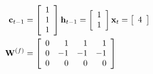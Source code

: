 \documentclass[xcolor={table}]{beamer}
\begin{document}
 \begin{frame} 
\begin{alignat}{2}
 \mathbf{c}_{t-1} &= 
 \left[
  \begin{array}{c}
1 \\
1 \\
1\\
  \end{array} 
  \right] 
 \mathbf{h}_{t-1} = 
 \left[
 \begin{array}{c}
   1 \\
   1 \\
  \end{array} 
  \right] 
 \mathbf{x}_{t}  = 
 \left[
 \begin{array}{c}
   4 \\
  \end{array} 
  \right] \notag\\
  \mathbf{W}^{(f)} & = 
 \left[
 \begin{array}{cccc}
 0 & \phantom{-}1 & \phantom{-}1 & \phantom{-}1\\
 0 & -1 & -1 & -1\\
 0 & \phantom{-}0 & \phantom{-}0 & \phantom{-}0\\
 \end{array}
 \right]\notag \\
\label{eqn:lstmforgetgatestate}
\end{alignat}
\end{frame} 
\end{document}
